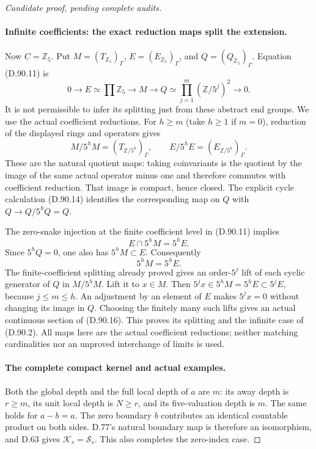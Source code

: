 \begin{proof}[Candidate proof, pending complete audits]
\paragraph{Infinite coefficients: the exact reduction maps split the extension.}
Now \(C=\mathbb Z_5\). Put
\(M=(T_{\mathbb Z_5})_\Gamma\),
\(E=(E_{\mathbb Z_5})_\Gamma\), and
\(Q=(Q_{\mathbb Z_5})_\Gamma\). Equation (D.90.11) is
\[
 0\longrightarrow E\simeq\prod\mathbb Z_5
       \longrightarrow M\longrightarrow
       Q\simeq\prod_{j=1}^{m}(\mathbb Z/5^j)^2
                                  \longrightarrow0.    \tag{D.90.16}
\]
It is not permissible to infer its splitting just from these
abstract end groups. We use the actual coefficient reductions.
For \(h\ge m\) (take \(h\ge1\) if \(m=0\)), reduction
of the displayed rings and operators gives
\[
 M/5^hM=(T_{\mathbb Z/5^h})_\Gamma,
 \qquad E/5^hE=(E_{\mathbb Z/5^h})_\Gamma.              \tag{D.90.17}
\]
These are the natural quotient maps: taking coinvariants is
the quotient by the image of the same actual operator minus
one and therefore commutes with coefficient reduction.
That image is compact, hence closed. The explicit cycle
calculation (D.90.14) identifies the corresponding map on
\(Q\) with \(Q\to Q/5^hQ=Q\).

The zero-snake injection at the finite coefficient level in
(D.90.11) implies
\[
                         E\cap5^hM=5^hE.
\]
Since \(5^hQ=0\), one also has \(5^hM\subset E\).
Consequently
\[
                              5^hM=5^hE.               \tag{D.90.18}
\]
The finite-coefficient splitting already proved gives an
order-\(5^j\) lift of each cyclic generator of \(Q\)
in \(M/5^hM\). Lift it to \(x\in M\). Then
\(5^j x\in5^hM=5^hE\subset5^jE\), because \(j\le m\le h\).
An adjustment by an element of \(E\) makes \(5^j x=0\)
without changing its image in \(Q\). Choosing the finitely
many such lifts gives an actual continuous section of
(D.90.16). This proves its splitting and the infinite case
of (D.90.2). All maps here are the actual coefficient
reductions; neither matching cardinalities nor an unproved
interchange of limits is used.

\paragraph{The complete compact kernel and actual examples.}
Both the global depth and the full local depth of \(a\)
are \(m\): its away depth is \(r\ge m\), its unit local
depth is \(N\ge r\), and its five-valuation depth is
\(m\). The same holds for \(a-b=a\). The zero boundary
\(b\) contributes an identical countable product on both
sides. D.77's natural boundary map is therefore an
isomorphism, and D.63 gives \(\mathcal K_s=\mathcal S_s\).
This also completes the zero-index case.


\end{proof}
